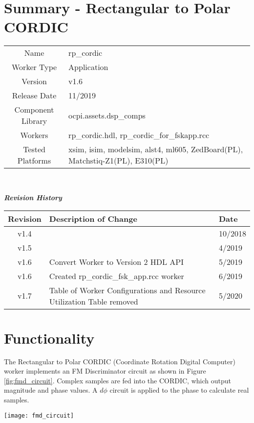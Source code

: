 \documentclass{article}
\author{} %
\date{Version \docVersion} %
\title{\docTitle}
\def\docVersion{1.6}
\def\comp{rp\_cordic}
\def\rcc_comp{rp\_cordic\_for\_fskapp}
\def\Comp{Rectangular to Polar CORDIC}
\begin{document}
\section*{Summary - \Comp}
\begin{tabular}{|c|M{13.5cm}|}
	\hline
	                  &                                                    \\
	\hline
	Name              & \comp                    \\
	\hline
	Worker Type       & Application                                        \\
	\hline
	Version           & v\docVersion \\
	\hline
	Release Date      & 11/2019 \\
	\hline
	Component Library & ocpi.assets.dsp\_comps                              \\
	\hline
	Workers           & \comp.hdl, \rcc_comp.rcc                            \\
	\hline
	Tested Platforms  & xsim, isim, modelsim, alst4, ml605, ZedBoard(PL), Matchstiq-Z1(PL), E310(PL)\\
	\hline
\end{tabular}\\ \bigskip

\begin{center}
	\textit{\textbf{Revision History}}
	\begin{table}[H]
	\label{table:revisions} %
		\begin{tabularx}{\textwidth}{|c|X|l|}
		\hline
		\rowcolor{blue}
		\textbf{Revision} & \textbf{Description of Change} & \textbf{Date} \\
		\hline
		v1.4 & & 10/2018 \\
		\hline
		v1.5 & & 4/2019 \\
		\hline
		v1.6 & Convert Worker to Version 2 HDL API & 5/2019 \\
		\hline
		v1.6 & Created rp\_cordic\_fsk\_app.rcc worker &  6/2019 \\
		\hline
		v1.7 & Table of Worker Configurations and Resource Utilization Table removed & 5/2020 \\
			\hline
		\end{tabularx}
	\end{table}
\end{center}

\section*{Functionality}
\begin{flushleft}
	The Rectangular to Polar CORDIC (Coordinate Rotation Digital Computer) worker implements an FM Discriminator circuit as shown in Figure \ref{fig:fmd_circuit}. Complex samples are fed into the CORDIC, which output magnitude and phase values. A $d\phi$ circuit is applied to the phase to calculate real samples.
\end{flushleft}
{\centering\captionsetup{type=figure}\texttt{[image: fmd\_circuit]}\par{}\label{fig:fmd_circuit}}
\end{document}
